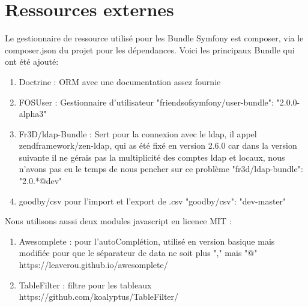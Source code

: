 \chapter{Ressources externes}
Le gestionnaire de ressource utilisé pour les Bundle Symfony est composer, via le composer.json du projet pour les dépendances.
Voici les principaux Bundle qui ont été ajouté:
 \newline
\begin{enumerate}

\item Doctrine : ORM avec une documentation assez fournie
 \newline
 \item FOSUser : Gestionnaire d'utilisateur
 \newline	"friendsofsymfony/user-bundle": "2.0.0-alpha3"
	 \newline
\item Fr3D/ldap-Bundle : Sert pour la connexion avec le ldap, il appel zendframework/zen-ldap, qui as été fixé en version 2.6.0 car dans la version suivante il ne gérais pas la multiplicité des comptes ldap et locaux, nous n'avons pas eu le temps de nous pencher sur ce problème
     \newline    "fr3d/ldap-bundle": "2.0.*@dev"
         \newline
\item goodby/csv pour l'import et l'export de .csv
    \newline     "goodby/csv": "dev-master"
 \newline
\end{enumerate}


Nous utilisons aussi deux modules javascript en licence MIT :

 \begin{enumerate}

\item Awesomplete : pour l'autoComplétion, utilisé en version basique mais modifiée pour que le séparateur de data ne soit plus "," mais "@"
\newline https://leaverou.github.io/awesomplete/
	\newline
\item TableFilter : filtre pour les tableaux
\newline https://github.com/koalyptus/TableFilter/	
\newline

\end{enumerate}